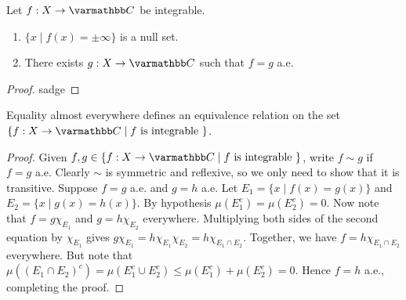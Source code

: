 \begin{proposition}\label{prop:properties-of-integrability}
    Let $f:X \rightarrow \bfC$ be integrable.
    \phantom{a}
    \begin{enumerate}[label = (\arabic*),itemsep=1pt,topsep=3pt]
        \item $\{x \mid f(x) = \pm \infty\}$ is a null set.
        \item There exists $g:X \rightarrow \bfC$ such that $f = g$ a.e.
    \end{enumerate}
\end{proposition}
    \begin{proof}
        {\color{red} sadge}
    \end{proof}

\begin{theorem}\label{thm:equality-almost-everywhere-equiv-relation}
    Equality almost everywhere defines an equivalence relation on the set $\{f:X \rightarrow \bfC \mid f \text{ is integrable }\}$.
\end{theorem}
    \begin{proof}
        Given $f,g \in \{f:X \rightarrow \bfC \mid f \text{ is integrable }\}$, write $f \sim g$ if $f = g$ a.e. Clearly $\sim$ is symmetric and reflexive, so we only need to show that it is transitive. Suppose $f = g$ a.e. and $g = h$ a.e. Let $E_1 = \{x \mid f(x) = g(x)\}$ and $E_2 = \{x \mid g(x) = h(x)\}$. By hypothesis $\mu(E_1^c) = \mu(E_2^c) = 0$. Now note that $f = g \chi_{E_1}$ and $g = h \chi_{E_2}$ everywhere. Multiplying both sides of the second equation by $\chi_{E_1}$ gives $g \chi_{E_1} = h \chi_{E_1} \chi_{E_2} = h \chi_{E_1 \cap E_2}$. Together, we have $f = h \chi_{E_1 \cap E_2}$ everywhere. But note that $\mu((E_1 \cap E_2)^c) = \mu(E_1^c \cup E_2^c) \leq \mu(E_1^c) + \mu(E_2^c) = 0$. Hence $f = h$ a.e., completing the proof.
    \end{proof}

